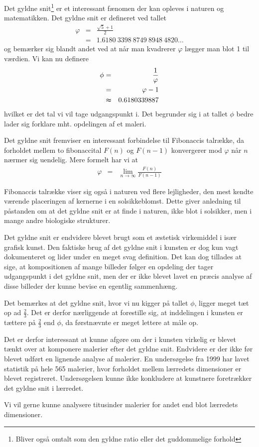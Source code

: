 Det gyldne snit\footnote{Bliver også omtalt som den gyldne ratio eller det
guddommelige forhold} er et interessant fænomen der kan opleves i naturen og
matematikken. Det gyldne snit er defineret ved tallet
\begin{eqnarray*}
	\varphi	& =	& \frac{\sqrt{5} + 1}{2}\\
		& = 	& 1.6180\ 3398\ 8749\ 8948\ 4820 \dots
\end{eqnarray*}
og bemærker sig blandt andet ved at når man kvadrerer $\varphi$ lægger man
blot 1 til værdien\cite{Bib:MWGold}\cite{Bib:Knott}. Vi kan nu definere
\begin{eqnarray*}
	\phi	& = 		& \frac{1}{\varphi}\\
		& = 		& \varphi - 1\\
		& \thickapprox	& 0.6180339887
\end{eqnarray*}
hvilket er det tal vi vil tage udgangspunkt i. Det begrunder sig i at tallet
$\phi$ bedre lader sig forklare mht. opdelingen af et maleri.

Det gyldne snit fremviser en interessant forbindelse til
Fibonaccis talrække, da forholdet mellem to fibonaccital $F(n)$ og $F(n - 1)$
konvergerer mod $\varphi$ når $n$ nærmer sig uendelig. Mere formelt har vi at
\begin{eqnarray*}
	\varphi	& =	& \lim_{n \rightarrow \infty}{\frac{F(n)}{F(n - 1)}}
\end{eqnarray*}

Fibonaccis talrække viser sig også i naturen ved flere lejligheder, den mest
kendte værende placeringen af kernerne i en
solsikkeblomst\cite{Bib:Dou}. Dette
giver anledning til påstanden om at det gyldne snit er at finde i naturen, ikke
blot i solsikker, men i mange andre biologiske strukturer.

Det gyldne snit er endvidere blevet brugt som et æstetisk virkemiddel i især
grafisk kunst. Den faktiske brug af det gyldne snit i kunsten er dog kun vagt
dokumenteret og lider under en meget svag definition\cite{Bib:Mark}.
Det kan dog tillades at sige, at kompositionen af mange
billeder følger en opdeling der tager
udgangspunkt i det gyldne snit, men der er ikke blevet lavet en præcis analyse
af disse billeder der kunne bevise en egentlig sammenhæng.

Det bemærkes at det gyldne snit, hvor vi nu kigger på tallet $\phi$, ligger
meget tæt op ad $\frac{2}{3}$.  Det er derfor nærliggende at forestille sig, at
inddelingen i kunsten er tættere på $\frac{2}{3}$ end $\phi$, da førstnævnte
er meget lettere at måle op.

Det er derfor interessant at kunne afgøre om der i kunsten virkelig er blevet
tænkt over at komponere malerier efter det gyldne snit. Endvidere er der ikke
før blevet udført en lignende analyse af malerier. En undersøgelse fra 1999 har
lavet statistik på hele 565 malerier, hvor forholdet mellem lærredets
dimensioner er blevet registreret\cite{Bib:Painting}. Undersøgelsen kunne ikke
konkludere at kunstnere foretrækker det gyldne snit i lærredet.

Vi vil gerne kunne analysere titusinder malerier for andet end blot lærredets
dimensioner.
